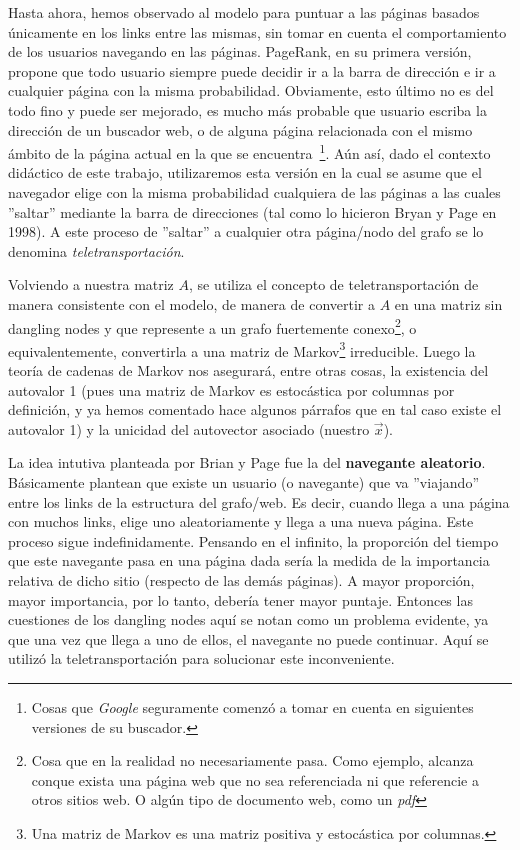 \par Hasta ahora, hemos observado al modelo para puntuar a las p\'aginas basados
\'unicamente en los links entre las mismas, sin tomar en cuenta el
comportamiento de los usuarios navegando en las p\'aginas. PageRank, en su
primera versi\'on, propone que todo usuario siempre puede decidir ir a la barra
de direcci\'on e ir a cualquier p\'agina con la misma probabilidad. Obviamente,
esto \'ultimo no es del todo fino y puede ser mejorado, es mucho m\'as probable
que usuario escriba la direcci\'on de un buscador web, o de alguna p\'agina
relacionada con el mismo \'ambito de la p\'agina actual en la que se
encuentra~\footnote{Cosas que \emph{Google} seguramente comenz\'o a tomar en
cuenta en siguientes versiones de su buscador.}. A\'un as\'i, dado el contexto
did\'actico de este trabajo, utilizaremos esta versi\'on en la cual se asume que
el navegador elige con la misma probabilidad cualquiera de las p\'aginas a las
cuales ''saltar'' mediante la barra de direcciones (tal como lo hicieron Bryan y
Page en 1998).  A este proceso de ''saltar'' a cualquier otra p\'agina/nodo del
grafo se lo denomina \emph{teletransportaci\'on}.

\par Volviendo a nuestra matriz $A$, se utiliza el concepto de
teletransportaci\'on de manera consistente con el modelo, de manera de convertir
a $A$ en una matriz sin dangling nodes y que represente a un grafo fuertemente
conexo\footnote{Cosa que en la realidad no necesariamente pasa. Como ejemplo,
alcanza conque exista una p\'agina web que no sea referenciada ni que referencie
a otros sitios web. O alg\'un tipo de documento web, como un \emph{pdf}}, o
equivalentemente, convertirla a una matriz de Markov\footnote{Una matriz de
Markov es una matriz positiva y estoc\'astica por columnas.} irreducible. Luego
la teor\'ia de cadenas de Markov nos asegurar\'a, entre otras cosas, la
existencia del autovalor 1 (pues una matriz de Markov es estoc\'astica por
columnas por definici\'on, y ya hemos comentado hace algunos p\'arrafos que en
tal caso existe el autovalor 1) y la unicidad del autovector asociado (nuestro
$\vec{x}$).

\par La idea intutiva planteada por Brian y Page fue la del \textbf{navegante
aleatorio}. B\'asicamente plantean que existe un usuario (o navegante) que va
''viajando'' entre los links de la estructura del grafo/web. Es decir, cuando
llega a una p\'agina con muchos links, elige uno aleatoriamente y llega a una
nueva p\'agina. Este proceso sigue indefinidamente. Pensando en el infinito, la
proporci\'on del tiempo que este navegante pasa en una p\'agina dada ser\'ia la
medida de la importancia relativa de dicho sitio (respecto de las dem\'as
p\'aginas). A mayor proporci\'on, mayor importancia, por lo tanto, deber\'ia
tener mayor puntaje. Entonces las cuestiones de los dangling nodes aqu\'i se
notan como un problema evidente, ya que una vez que llega a uno de ellos, el
navegante no puede continuar. Aqu\'i se utiliz\'o la teletransportaci\'on para
solucionar este inconveniente.

